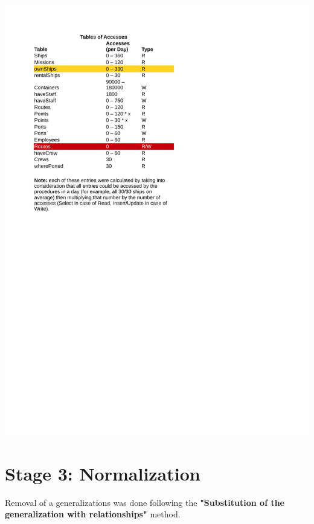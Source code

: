 \documentclass[10pt]{report}
\begin{document}
\begin{center}
	\includegraphics[trim=2cm 12cm 9cm 0cm,clip=true, height=.85\textheight, width=\textwidth]{Accesses.pdf}
\end{center}
\newpage
\chapter*{Stage 3: Normalization}
Removal of a generalizations was done following the \textbf{"Substitution of the generalization with relationships"} method.\\
\end{document}
